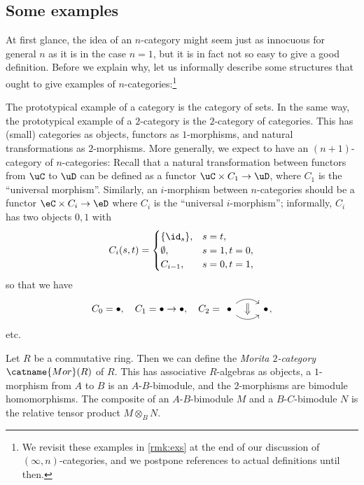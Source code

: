 \documentclass[a4paper,12pt]{article}
\begin{document}
\subsection{Some examples}\label{subsec:exs}

At first glance, the idea of an $n$-category might seem just as
innocuous for general $n$ as it is in the case $n=1$, but it is in
fact not so easy to give a good definition. Before we explain why, let
us informally describe some structures that ought to give examples of
$n$-categories:\footnote{We revisit these examples in \cref{rmk:exs} at the end of our
  discussion of $(\infty,n)$-categories, and we postpone references to
actual definitions until then.}

\begin{ex}\label{ex:catofncat}
  The prototypical example of a category is the category of sets.  In
  the same way, the prototypical example of a $2$-category is the
  $2$-category of categories. This has (small) categories as objects,
  functors as $1$-morphisms, and natural transformations as
  $2$-morphisms. More generally, we expect to have an $(n+1)$-category
  of $n$-categories: Recall that a natural transformation between
  functors from $\uC$ to $\uD$ can be
  defined as a functor $\uC \times C_{1} \to \uD$, where $C_{1}$ is
  the ``universal morphism''.
  Similarly, an $i$-morphism between $n$-categories should be a
  functor $\eC \times C_{i} \to \eD$ where $C_{i}$ is the ``universal
  $i$-morphism''; informally, $C_{i}$ has two objects $0,1$ with
  \[
    C_{i}(s,t) =
    \begin{cases}
      \{\id_{s}\}, & s = t, \\
      \emptyset, & s = 1, t = 0, \\
      C_{i-1}, & s = 0, t = 1,
    \end{cases}
  \]
  so that we have
  \[ C_{0}=\bullet,\quad C_{1} = \bullet \to \bullet, \quad C_{2} =
        \begin{tikzcd}
      \bullet \ar[r, bend left=40, ""{below,name=A,inner sep=2pt}]
      \ar[r, bend right=40, ""{above,name=B,inner sep=2pt}] & \bullet
      \ar[from=A, to=B, Rightarrow]
    \end{tikzcd}\!\!,
  \]
  etc.
\end{ex}

\begin{ex}\label{ex:morita}
  Let $R$ be a commutative ring. Then we can define the \emph{Morita
    $2$-category} $\catname{Mor}(R)$ of $R$. This has associative $R$-algebras as objects,
  a $1$-morphism from $A$ to $B$ is an $A$-$B$-bimodule, and the
  $2$-morphisms are bimodule homomorphisms. The composite of an
  $A$-$B$-bimodule $M$ and a $B$-$C$-bimodule $N$ is the relative
  tensor product $M \otimes_{B} N$.
\end{ex}
\end{document}
